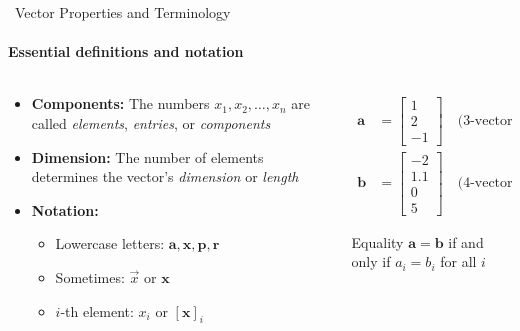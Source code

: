 \documentclass[12pt,aspectratio=169]{beamer}
\begin{document}
\begin{frame}{\faInfoCircle \, Vector Properties and Terminology}
\framesubtitle{Essential definitions and notation}

\begin{columns}[T]
    \begin{column}{0.5\textwidth}
        \begin{itemize}[<+->]
            \item \textbf{Components:} The numbers $x_1, x_2, \ldots, x_n$ are called \emph{elements}, \emph{entries}, or \emph{components}
            
            \item \textbf{Dimension:} The number of elements determines the vector's \emph{dimension} or \emph{length}
            
            \item \textbf{Notation:} 
            \begin{itemize}
                \item Lowercase letters: $\mathbf{a}, \mathbf{x}, \mathbf{p}, \mathbf{r}$
                \item Sometimes: $\vec{x}$ or $\boldsymbol{x}$
                \item $i$-th element: $x_i$ or $[\mathbf{x}]_i$
            \end{itemize}
        \end{itemize}
    \end{column}
    
    \begin{column}{0.45\textwidth}
        \begin{example}
            \begin{align}
                \mathbf{a} &= \begin{bmatrix} 1 \\ 2 \\ -1 \end{bmatrix} \quad \text{(3-vector)}\\[0.5cm]
                \mathbf{b} &= \begin{bmatrix} -2 \\ 1.1 \\ 0 \\ 5 \end{bmatrix} \quad \text{(4-vector)}
            \end{align}
        \end{example}
        
        \vspace{0.3cm}
        \begin{block}{Equality}
            $\mathbf{a} = \mathbf{b}$ if and only if $a_i = b_i$ for all $i$
        \end{block}
    \end{column}
\end{columns}
\end{frame}
\end{document}
